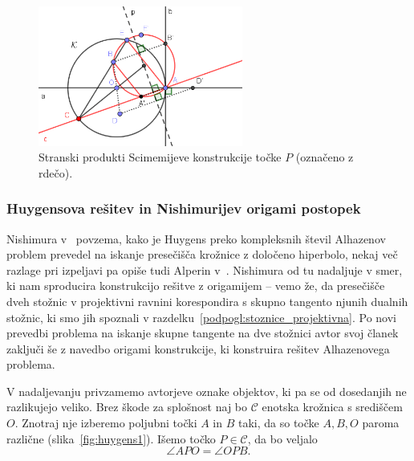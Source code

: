 
\begin{figure}[h]
    \centering
    \includegraphics[width=0.6\textwidth]{images/alhazen/scimemi_stransko.png}
    \caption[Stranski produkt Scimemija]{Stranski produkti Scimemijeve konstrukcije točke $P$ (označeno z rdečo).}
    \label{fig:scimemi_opomba}
\end{figure}

\subsubsection*{Huygensova rešitev in Nishimurijev origami postopek}

Nishimura v~\cite{nishimura2018} povzema, kako je Huygens preko kompleksnih števil Alhazenov problem prevedel na iskanje presečišča krožnice z določeno hiperbolo, nekaj več razlage pri izpeljavi pa opiše tudi Alperin v~\cite{alperin2002}. Nishimura od tu nadaljuje v smer, ki nam sproducira konstrukcijo rešitve z origamijem -- vemo že, da presečišče dveh stožnic v projektivni ravnini korespondira s skupno tangento njunih dualnih stožnic, ki smo jih spoznali v razdelku~\ref{podpogl:stoznice_projektivna}. Po novi prevedbi problema na iskanje skupne tangente na dve stožnici avtor svoj članek zaključi še z navedbo origami konstrukcije, ki konstruira rešitev Alhazenovega problema.

V nadaljevanju privzamemo avtorjeve oznake objektov, ki pa se od dosedanjih ne razlikujejo veliko. Brez škode za splošnost naj bo $\mathcal{C}$ enotska krožnica s središčem $O$. Znotraj nje izberemo poljubni točki $A$ in $B$ taki, da so točke $A,B,O$ paroma različne (slika~\ref{fig:huygens1}). Išemo točko $P \in \mathcal{C}$, da bo veljalo
\begin{equation}
    \label{eq:huygens_pogoj}
    \angle APO = \angle OPB.
\end{equation}

